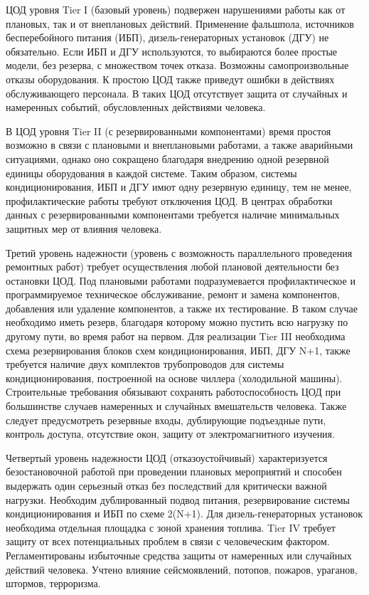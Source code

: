 ЦОД уровня Tier I (базовый уровень) подвержен нарушениями работы как от плановых, так и от внеплановых действий.
Применение фальшпола, источников бесперебойного питания (ИБП), дизель-генераторных установок (ДГУ) не обязательно.
Если ИБП и ДГУ используются, то выбираются более простые модели, без резерва, с множеством точек отказа.
Возможны самопроизвольные отказы оборудования.
К простою ЦОД также приведут ошибки в действиях обслуживающего персонала.
В таких ЦОД отсутствует защита от случайных и намеренных событий, обусловленных действиями человека.

В ЦОД уровня Tier II (с резервированными компонентами) время простоя возможно в связи с плановыми и внеплановыми работами, а также аварийными ситуациями, однако оно сокращено благодаря внедрению одной резервной единицы оборудования в каждой системе.
Таким образом, системы кондиционирования, ИБП и ДГУ имют одну резервную единицу, тем не менее, профилактические работы требуют отключения ЦОД.
В центрах обработки данных с резервированными компонентами требуется наличие минимальных защитных мер от влияния человека.

Третий уровень надежности (уровень с возможность параллельного проведения ремонтных работ) требует осуществления любой плановой деятельности без остановки ЦОД.
Под плановыми работами подразумевается профилактическое и программируемое техническое обслуживание, ремонт и замена компонентов, добавления или удаление компонентов, а также их тестирование.
В таком случае необходимо иметь резерв, благодаря которому можно пустить всю нагрузку по другому пути, во время работ на первом.
Для реализации Tier III необходима схема резервирования блоков схем кондиционирования, ИБП, ДГУ N+1, также требуется наличие двух комплектов трубопроводов для системы кондиционирования, построенной на основе чиллера (холодильной машины).
Строительные требования обязывают сохранять работоспособность ЦОД при большинстве случаев намеренных и случайных вмешательств человека.
Также следует предусмотреть резервные входы, дублирующие подъездные пути, контроль доступа, отсутствие окон, защиту от электромагнитного изучения.

Четвертый уровень надежности ЦОД (отказоустойчивый) характеризуется безостановочной работой при проведении плановых мероприятий и способен выдержать один серьезный отказ без последствий для критически важной нагрузки.
Необходим дублированный подвод питания, резервирование системы кондиционирования и ИБП по схеме 2(N+1).
Для дизель-генераторных установок необходима отдельная площадка с зоной хранения топлива.
Tier IV требует защиту от всех потенциальных проблем в связи с человеческим фактором.
Регламентированы избыточные средства защиты от намеренных или случайных действий человека.
Учтено влияние сейсмоявлений, потопов, пожаров, ураганов, штормов, терроризма.

